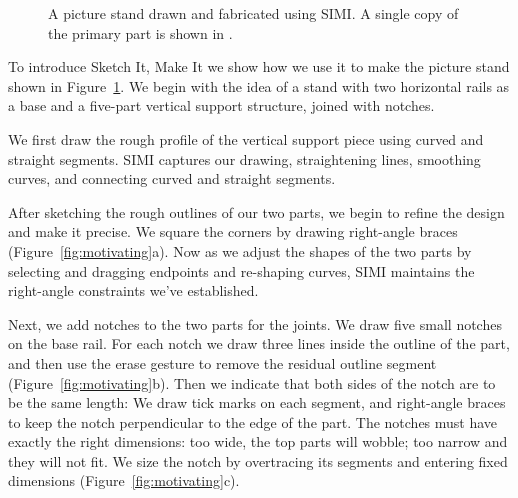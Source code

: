 \begin{figure}[h]
\centering 
{}
\caption{A picture stand  drawn and fabricated
  using SIMI. A single copy of the primary part is shown in
  . }
\label{fig:simi-example}
\end{figure}

To introduce Sketch It, Make It we show how we use it to make the
picture stand shown in Figure~\ref{fig:simi-example}. We begin with
the idea of a stand with two horizontal rails as a base and a
five-part vertical support structure, joined with notches.

We first draw the rough profile of the vertical support piece using
curved and straight segments. SIMI captures our drawing, straightening
lines, smoothing curves, and connecting curved and straight segments.
 
After sketching the rough outlines of our two parts, we begin to
refine the design and make it precise.  We square the corners by
drawing right-angle braces (Figure~\ref{fig:motivating}a).  Now as we
adjust the shapes of the two parts by selecting and dragging endpoints
and re-shaping curves, SIMI maintains the right-angle constraints
we've established.
 
Next, we add notches to the two parts for the joints. We draw five
small notches on the base rail. For each notch we draw three lines
inside the outline of the part, and then use the erase gesture to
remove the residual outline segment (Figure~\ref{fig:motivating}b).
Then we indicate that both sides of the notch are to be the same
length: We draw tick marks on each segment, and right-angle braces to
keep the notch perpendicular to the edge of the part. The notches must
have exactly the right dimensions: too wide, the top parts will
wobble; too narrow and they will not fit. We size the notch by
overtracing its segments and entering fixed dimensions
(Figure~\ref{fig:motivating}c).
 
